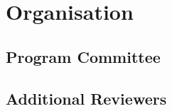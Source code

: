 \section*{Organisation}

\makeorganisation

\subsection*{Program Committee}
\noindent
\pcmembers

\subsection*{Additional Reviewers}
\noindent
\additionalreviewers
